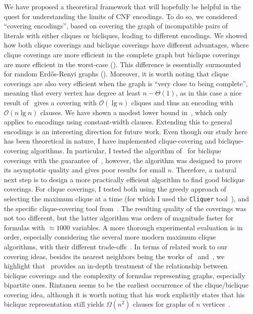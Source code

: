 \documentclass[11pt]{article}
\renewcommand{\O}{\mathcal{O}}
\begin{document}
We have proposed a theoretical framework that will hopefully be helpful in the quest for understanding the limits of CNF encodings. To do so, we considered ``covering encodings'', based on covering the graph of incompatible pairs of literals with either cliques or bicliques, leading to different encodings. We showed how both clique coverings and biclique coverings have different advantages, where clique coverings are more efficient in the complete graph but biclique coverings are more efficient in the worst-case (). This difference is essentially surmounted for random Erd\H{o}s-Renyi graphs (). 
Moreover, it is worth noting that clique coverings are also very efficient when the graph is ``very close to being complete'', meaning that every vertex has degree at least $n - \Theta(1)$, as in this case a nice result of~\citet{alonCoveringGraphsMinimum1986} gives a covering with $\O(\lg n)$ cliques and thus an encoding with $\O(n \lg n)$ clauses.
We have shown a modest lower bound in~, which only applies to encodings using constant-width clauses. Extending this to general encodings is an interesting direction for future work.
Even though our study here has been theoretical in nature, I have implemented clique-covering and biclique-covering algorithms. 
In particular, I tested the algorithm of~\citet{mubayiFindingBipartiteSubgraphs2010} for biclique coverings with the guarantee of~, however, the algorithm was designed to prove its asymptotic quality and gives poor results for small $n$. Therefore, a natural next step is to design a more practically efficient algorithm to find good biclique coverings.
For clique coverings, I tested both using the greedy approach of selecting the maximum clique at a time (for which I used the \texttt{Cliquer} tool~\citep{aaltoCliquerHomepage}), and the specific clique-covering tool from~\citet{algCliqueCovering}. The resulting quality of the coverings was not too different, but the latter algorithm was orders of magnitude faster for formulas with $\approx \! 1000$ variables.
A more thorough experimental evaluation is in order, especially considering the several more modern maximum clique algorithms, with their different trade-offs~\citep{wuReviewAlgorithmsMaximum2015}.
In terms of related work to our covering ideas, besides its nearest neighbors being the works of~\citet{Rintanen} and~\citet{ignatievCardinalityEncodingsGraph2017}, we highlight that~\citet{juknaComputationalComplexityGraphs2013} provides an in-depth treatment of the relationship between biclique coverings and the complexity of formulas representing graphs, especially bipartite ones.
Rintanen seems to be the earliest occurrence of the clique/biclique covering idea, although it is worth noting that his work explicitly states that his biclique representation still yields $\Omega(n^2)$ clauses for graphs of $n$ vertices~\citep[Section 6]{Rintanen}.
\end{document}
